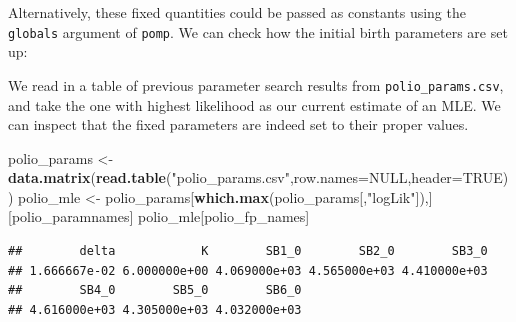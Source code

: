 \documentclass[]{article}
\newenvironment{Shaded}{\begin{snugshade}}{\end{snugshade}}
\newcommand{\KeywordTok}[1]{\textcolor[rgb]{0.13,0.29,0.53}{\textbf{#1}}}
\newcommand{\DataTypeTok}[1]{\textcolor[rgb]{0.13,0.29,0.53}{#1}}
\newcommand{\DecValTok}[1]{\textcolor[rgb]{0.00,0.00,0.81}{#1}}
\newcommand{\FloatTok}[1]{\textcolor[rgb]{0.00,0.00,0.81}{#1}}
\newcommand{\StringTok}[1]{\textcolor[rgb]{0.31,0.60,0.02}{#1}}
\newcommand{\OtherTok}[1]{\textcolor[rgb]{0.56,0.35,0.01}{#1}}
\newcommand{\OperatorTok}[1]{\textcolor[rgb]{0.81,0.36,0.00}{\textbf{#1}}}
\newcommand{\NormalTok}[1]{#1}
\begin{document}
Alternatively, these fixed quantities could be passed as constants using
the \texttt{globals} argument of \texttt{pomp}. We can check how the
initial birth parameters are set up:

\begin{Shaded}
\end{Shaded}

We read in a table of previous parameter search results from
\texttt{polio\_params.csv}, and take the one with highest likelihood as
our current estimate of an MLE. We can inspect that the fixed parameters
are indeed set to their proper values.

\begin{Shaded}
\begin{Highlighting}[]
\NormalTok{polio_params <-}\StringTok{ }\KeywordTok{data.matrix}\NormalTok{(}\KeywordTok{read.table}\NormalTok{(}\StringTok{"polio_params.csv"}\NormalTok{,}\DataTypeTok{row.names=}\OtherTok{NULL}\NormalTok{,}\DataTypeTok{header=}\OtherTok{TRUE}\NormalTok{))}
\NormalTok{polio_mle <-}\StringTok{ }\NormalTok{polio_params[}\KeywordTok{which.max}\NormalTok{(polio_params[,}\StringTok{"logLik"}\NormalTok{]),][polio_paramnames]}
\NormalTok{polio_mle[polio_fp_names]}
\end{Highlighting}
\end{Shaded}

\begin{verbatim}
##        delta            K        SB1_0        SB2_0        SB3_0 
## 1.666667e-02 6.000000e+00 4.069000e+03 4.565000e+03 4.410000e+03 
##        SB4_0        SB5_0        SB6_0 
## 4.616000e+03 4.305000e+03 4.032000e+03
\end{verbatim}
\end{document}
